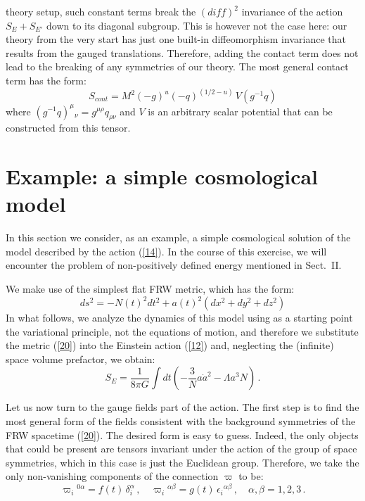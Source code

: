 \documentclass [prd,reprint,eqsecnum,nofootinbib]  {revtex4-1}
\begin{document}
theory setup, such constant terms break the $(diff)^2$ invariance of
the action $S_E+S_{E'}$ down to its diagonal subgroup. This is
however not the case here: our theory from the very start has just
one built-in diffeomorphism invariance that results from the gauged
translations. Therefore, adding the contact term does not lead to the
breaking of any symmetries of our theory. The most general contact
term has the form:
\begin{equation}\label{19}
    S_{cont} =
   {M^2}(-g)^u(-q)^{(1/2-u)}\, V(g^{-1}q)
\end{equation}
where $(g^{-1}q)^\mu{}_\nu = g^{\mu\rho}q_{\rho\nu}$ and $V$ is an
arbitrary scalar potential that can be constructed from this tensor.

\section{Example: a simple cosmological model}

In this section we consider, as an example, a simple cosmological
solution of the model described by the action (\ref{14}). In the
course of this exercise, we will encounter the problem of
non-positively defined energy mentioned in Sect.\ II.

We make use of the simplest flat FRW metric, which has the form:
\begin{equation}\label{20}
    ds^2 =-N(t)^2dt^2+a(t)^2 (dx^2+dy^2+dz^2)
\end{equation}
In what follows, we analyze the dynamics of this model using as a
starting point the variational principle, not the equations of
motion, and therefore we substitute the metric (\ref{20}) into the
Einstein action (\ref{12}) and, neglecting the (infinite) space
volume prefactor, we obtain:
\begin{equation}
S_E=\frac{1}{8\pi G}\int dt \left(-\frac{3}{N}a\dot a^2-\Lambda a^3
N\right)\,.\label{21}
\end{equation}

Let us now turn to the gauge fields part of the action. The first
step is to find the most general form of the fields consistent with
the background symmetries of the FRW spacetime (\ref{20}). The
desired form is easy to guess. Indeed, the only objects that could be
present are tensors invariant under the action of the group of space
symmetries, which in this case is just the Euclidean group.
Therefore, we take the only non-vanishing components of the
connection $\varpi$ to be:
\begin{equation}\label{22}
    \varpi_i{}^{0\alpha} = f(t)\, \delta_i^\alpha\,,
    \quad \varpi_i{}^{\alpha\beta} = g(t)\,
    \epsilon_i{}^{\alpha\beta}\,,\quad \alpha,\beta=1,2,3\,.
\end{equation}
\end{document}

